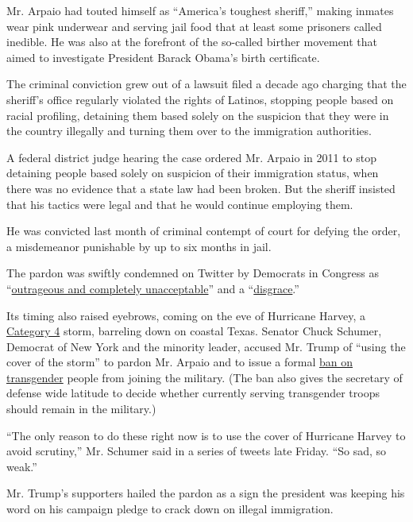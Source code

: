 Mr. Arpaio had touted himself as ``America's toughest sheriff,'' making
inmates wear pink underwear and serving jail food that at least some
prisoners called inedible. He was also at the forefront of the so-called
birther movement that aimed to investigate President Barack Obama's
birth certificate.

The criminal conviction grew out of a lawsuit filed a decade ago
charging that the sheriff's office regularly violated the rights of
Latinos, stopping people based on racial profiling, detaining them based
solely on the suspicion that they were in the country illegally and
turning them over to the immigration authorities.

A federal district judge hearing the case ordered Mr. Arpaio in 2011 to
stop detaining people based solely on suspicion of their immigration
status, when there was no evidence that a state law had been broken. But
the sheriff insisted that his tactics were legal and that he would
continue employing them.

He was convicted last month of criminal contempt of court for defying
the order, a misdemeanor punishable by up to six months in jail.

The pardon was swiftly condemned on Twitter by Democrats in Congress as
``\href{https://twitter.com/repmarkpocan/status/901234877873442816}{outrageous
and completely unacceptable}'' and a
``\href{https://twitter.com/RepKClark/status/901236788735467521}{disgrace}.''

Its timing also raised eyebrows, coming on the eve of Hurricane Harvey,
a
\href{https://www.nytimes.com/2017/08/25/us/hurricane-harvey.html}{Category
4} storm, barreling down on coastal Texas. Senator Chuck Schumer,
Democrat of New York and the minority leader, accused Mr. Trump of
``using the cover of the storm'' to pardon Mr. Arpaio and to issue a
formal
\href{https://www.nytimes.com/2017/08/25/us/politics/trump-mattis-transgender-ban.html?hp\&action=click\&pgtype=Homepage\&clickSource=story-heading\&module=first-column-region\&region=top-news\&WT.nav=top-news}{ban
on transgender} people from joining the military. (The ban also gives
the secretary of defense wide latitude to decide whether currently
serving transgender troops should remain in the military.)

``The only reason to do these right now is to use the cover of Hurricane
Harvey to avoid scrutiny,'' Mr. Schumer said in a series of tweets late
Friday. ``So sad, so weak.''

Mr. Trump's supporters hailed the pardon as a sign the president was
keeping his word on his campaign pledge to crack down on illegal
immigration.


